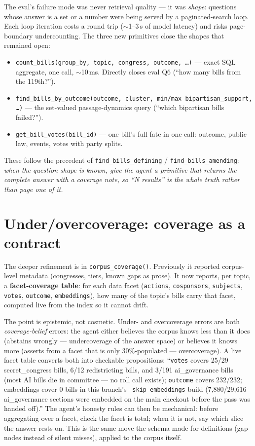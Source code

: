 \documentclass[11pt]{article}
\newcommand{\code}[1]{\texttt{#1}}
\begin{document}
The eval's failure mode was never retrieval quality --- it was \emph{shape}:
questions whose answer is a set or a number were being served by a
paginated-search loop. Each loop iteration costs a round trip
($\sim$1--3\,s of model latency) and risks page-boundary undercounting.
The three new primitives close the shapes that remained open:

\begin{itemize}[itemsep=2pt]
  \item \code{count\_bills(group\_by, topic, congress, outcome, \ldots)} ---
        exact SQL aggregate, one call, $\sim$10\,ms. Directly closes eval
        Q6 (``how many bills from the 119th?'').
  \item \code{find\_bills\_by\_outcome(outcome, cluster, min/max\
        bipartisan\_support, \ldots)} --- the set-valued passage-dynamics
        query (``which bipartisan bills failed?'').
  \item \code{get\_bill\_votes(bill\_id)} --- one bill's full fate in one
        call: outcome, public law, events, votes with party splits.
\end{itemize}

These follow the precedent of \code{find\_bills\_defining} /
\code{find\_bills\_amending}: \emph{when the question shape is known, give
the agent a primitive that returns the complete answer with a coverage
note, so ``N results'' is the whole truth rather than page one of it.}

\section{Under/overcoverage: coverage as a contract}

The deeper refinement is in \code{corpus\_coverage()}. Previously it
reported corpus-level metadata (congresses, tiers, known gaps as prose).
It now reports, per topic, a \textbf{facet-coverage table}: for each data
facet (\code{actions}, \code{cosponsors}, \code{subjects}, \code{votes},
\code{outcome}, \code{embeddings}), how many of the topic's bills carry
that facet, computed live from the index so it cannot drift.

The point is epistemic, not cosmetic. Under- and overcoverage errors are
both \emph{coverage-belief} errors: the agent either believes the corpus
knows less than it does (abstains wrongly --- undercoverage of the answer
space) or believes it knows more (asserts from a facet that is only
30\%-populated --- overcoverage). A live facet table converts both into
checkable propositions: ``\code{votes} covers 25/29 secret\_congress
bills, 6/12 redistricting bills, and 3/191 ai\_governance bills (most AI
bills die in committee --- no roll call exists); \code{outcome} covers
232/232; embeddings cover 0 bills in this branch's
\code{--skip-embeddings} build (7{,}880/29{,}616 ai\_governance sections
were embedded on the main checkout before the pass was handed off).'' The agent's
honesty rules can then be mechanical: before aggregating over a facet,
check the facet is total; when it is not, say which slice the answer rests
on. This is the same move the schema made for definitions (gap nodes
instead of silent misses), applied to the corpus itself.
\end{document}
